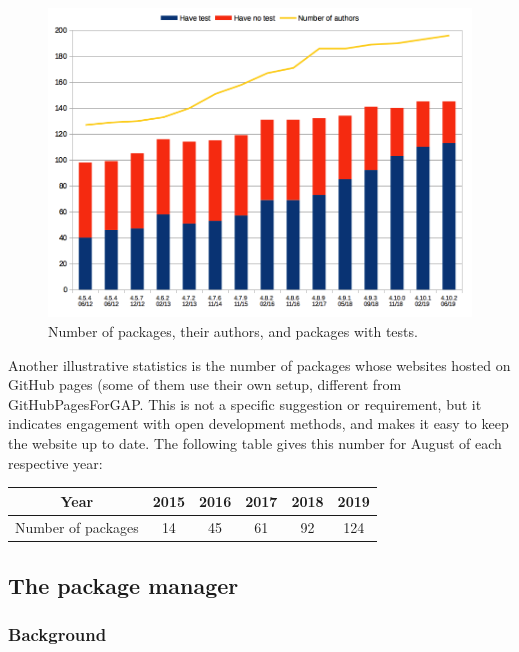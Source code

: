 \begin{figure}[!ht]
    \centering
    \includegraphics[width=\textwidth]{images/gap-package-tests}
    \caption{Number of \GAP packages, their authors, and packages with tests.}
    \label{fig:gap-package-tests}
\end{figure}

Another illustrative statistics is the number of \GAP packages
whose websites hosted on GitHub pages (some of them use
their own setup, different from {\sf GitHubPagesForGAP}. This is not a
specific suggestion or requirement, but it indicates engagement with
open development  methods, and makes it easy to keep the website up to date.
The following table gives this number for August of each respective year:

\begin{center}
\begin{tabular}{| c | c | c | c | c | c |} 
\hline
Year & 2015 & 2016 & 2017 & 2018 & 2019 \\
\hline
Number of packages & 14 & 45 & 61 & 92 & 124 \\
\hline
\end{tabular}
\end{center}

\subsection{The \GAP package manager}\label{pkg-manager}

\subsubsection{Background}

